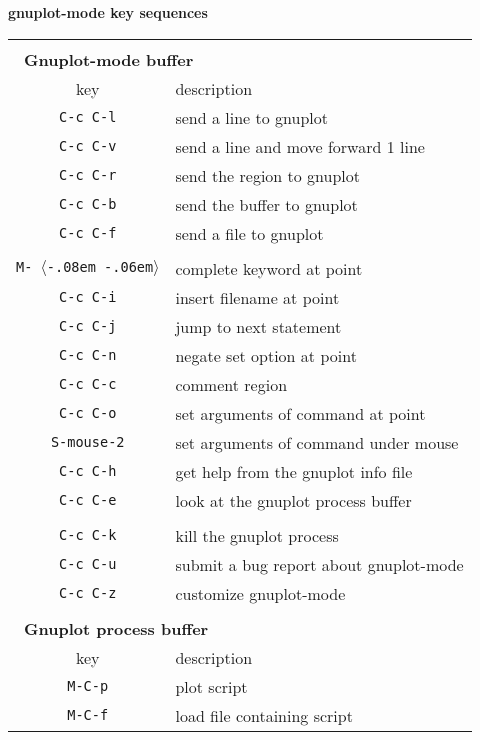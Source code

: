 \documentclass[twocolumn]{article}
\def\key#1{{\textrm \leavevmode\hbox{%
  \raise0.4pt\hbox{$\langle$}\kern-.08em\vtop{%
    \vbox{\hrule\kern-0.4pt
     \hbox{\raise0.4pt\hbox{\vphantom{$\langle$}}#1}}%
    \kern-0.4pt\hrule}%
  \kern-.06em\raise0.4pt\hbox{$\rangle$}}}}
\begin{document}
\begin{minipage}[h]{\linewidth}
  \begin{center}
    \centerline{{\large\textbf{gnuplot-mode key sequences}}}
    \vspace{0.2ex}
    \begin{tabular}[h]{cl}
      \hline \hline
      \\[-1ex]
      \multicolumn{2}{l}{~\quad\textbf{Gnuplot-mode buffer}}\\[0.5ex]
      \textrm{key} & \quad description \\
      \hline
      \texttt{C-c C-l} & send a line to gnuplot \\
      \texttt{C-c C-v} & send a line and move forward 1 line\\
      \texttt{C-c C-r} & send the region to gnuplot \\
      \texttt{C-c C-b} & send the buffer to gnuplot \\
      \texttt{C-c C-f} & send a file to gnuplot \\
      & \\[-1.5ex]
      \texttt{M-\key{tab}} & complete keyword at point \\
      \texttt{C-c C-i} & insert filename at point \\
      \texttt{C-c C-j} & jump to next statement \\
      \texttt{C-c C-n} & negate set option at point \\
      \texttt{C-c C-c} & comment region \\
      \texttt{C-c C-o} & set arguments of command at point \\
      \texttt{S-mouse-2} & set arguments of command under mouse \\
      \texttt{C-c C-h} & get help from the gnuplot info file \\
      \texttt{C-c C-e} & look at the gnuplot process buffer \\
      & \\[-1.5ex]
      \texttt{C-c C-k} & kill the gnuplot process \\
      \texttt{C-c C-u} & submit a bug report about gnuplot-mode \\
      \texttt{C-c C-z} & customize gnuplot-mode \\
      \hline
      \\[-1ex]
      \multicolumn{2}{l}{~\quad\textbf{Gnuplot process buffer}}\\[0.5ex]
      \textrm{key} & \quad description \\
      \hline
      \texttt{M-C-p}   & plot script \\
      \texttt{M-C-f}   & load file containing script \\
      \hline \hline
    \end{tabular}
  \end{center}
\end{minipage}
\end{document}

